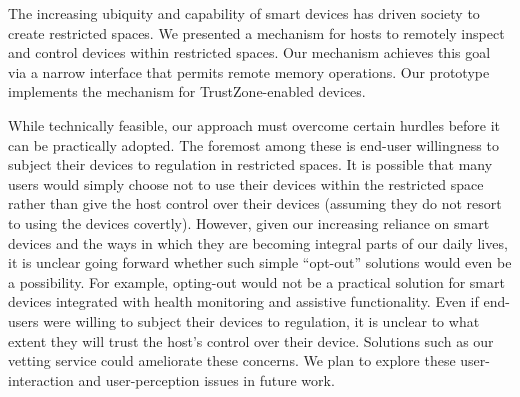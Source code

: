 \label{section:conclusions}

The increasing ubiquity and capability of smart devices has driven society to
create restricted spaces. We presented a mechanism for hosts to remotely
inspect and control devices within restricted spaces. Our mechanism achieves
this goal via a narrow interface that permits remote memory operations. Our
prototype implements the mechanism for TrustZone-enabled devices.

While technically feasible, our approach must overcome certain hurdles before
it can be practically adopted. The foremost among these is end-user willingness
to subject their devices to regulation in restricted spaces. It is possible
that many users would simply choose not to use their devices within the
restricted space rather than give the host control over their devices (assuming
they do not resort to using the devices covertly). However, given our
increasing reliance on smart devices and the ways in which they are becoming
integral parts of our daily lives, it is unclear going forward whether such
simple ``opt-out'' solutions would even be a possibility. For example,
opting-out would not be a practical solution for smart devices integrated with
health monitoring and assistive functionality. Even if end-users were willing
to subject their devices to regulation, it is unclear to what extent they will
trust the host's control over their device. Solutions such as our vetting
service could ameliorate these concerns. We plan to explore these
user-interaction and user-perception issues in future work.


% 
%
%
